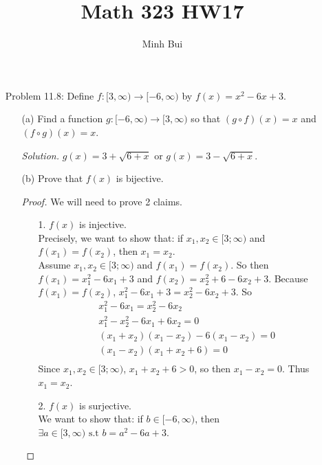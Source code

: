 \documentclass{article}
\author{Minh Bui}
\title{Math 323 HW17}
\theoremstyle{claim}
\theoremstyle{definition}
\begin{document}
\maketitle
\begin{enumerate}
    \item[Problem 11.8:] Define $f: [3, \infty) \rightarrow [-6, \infty)$ by $f(x) = x^2 - 6x + 3$.
        \begin{enumerate}
            \item[(a)] Find a function $g: [-6, \infty) \rightarrow [3, \infty)$ so that $(g \circ f)(x) = x$ and $(f \circ g)(x) = x$.
            \item[] \emph{Solution. } $g(x) = 3 + \sqrt{6 + x}$ or $g(x) = 3 - \sqrt{6 + x}$.
            \item[(b)] Prove that $f(x)$ is bijective.
            \begin{proof}
                We will need to prove 2 claims.
                \begin{enumerate}
                    \item[1.] $f(x)$ is injective.\\
                        Precisely, we want to show that: if $x_1, x_2 \in [3; \infty)$ and $f(x_1) = f(x_2)$, then $x_1 = x_2$.\\
                        Assume $x_1, x_2 \in [3; \infty)$ and $f(x_1) = f(x_2)$.
                        So then $f(x_1) = x_1^2 - 6x_1 + 3$ and $f(x_2) = x_2^2 + 6 - 6x_2 + 3$. Because $f(x_1) = f(x_2)$, $x_1^2 - 6x_1 + 3 = x_2^2 - 6x_2 + 3$. So
                        \begin{gather*}
                            x_1^2 - 6x_1 = x_2^2 - 6x_2\\
                            x_1^2 - x_2^2 - 6x_1 + 6x_2 = 0\\
                            (x_1 + x_2)(x_1 - x_2) - 6(x_1 - x_2) = 0\\
                            (x_1 - x_2)(x_1 + x_2 + 6) = 0\\
                        \end{gather*}
                        Since $x_1, x_2 \in [3; \infty)$, $x_1 + x_2 + 6 > 0$, so then $x_1 - x_2 = 0$. Thus $x_1 = x_2$.
                    \item[2.] $f(x)$ is surjective.\\
                        We want to show that: if $b \in [-6, \infty)$, then $\exists a \in [3, \infty) \text{ s.t } b = a^2 - 6a + 3$.\\

\end{enumerate}
\end{proof}
\end{enumerate}
\end{enumerate}
\end{document}
